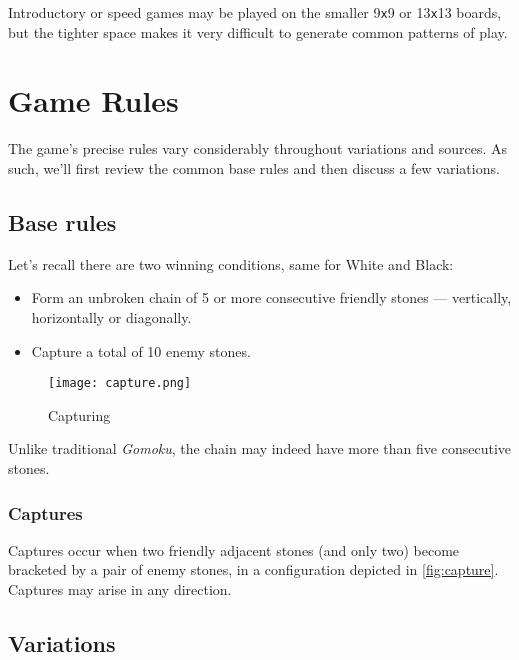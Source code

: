 \documentclass[12pt,a4paper,notitlepage]{article}
\newcommand*{\boardsize}[1]{#1\texttt{x}#1}
\begin{document}
Introductory or speed games may be played on the smaller \boardsize{9} or \boardsize{13} boards, but the tighter space makes it very difficult to generate common patterns of play.

\section{Game Rules}
\label{sec:rules}

The game's precise rules vary considerably throughout variations and sources. As such, we'll first review the common base rules and then discuss a few variations.

\subsection{Base rules}
\label{subsec:baserules}

Let's recall there are two winning conditions, same for White and Black:

\begin{itemize}
	\large
	\item Form an unbroken chain of 5 or more consecutive friendly stones --- vertically, horizontally or diagonally.
	\item Capture a total of 10 enemy stones.
\end{itemize}

\begin{wrapfigure}[8]{r}[2em]{0.3\textwidth}
	\vspace*{-3\baselineskip}
	\texttt{[image: capture.png]}
	\caption{Capturing\supercite{pente-net} \label{fig:capture}}
\end{wrapfigure}

Unlike traditional \textit{Gomoku}, the chain may indeed have more than five consecutive stones.

\subsubsection{Captures}
\label{subsubsec:captures}

Captures occur when two friendly adjacent stones (and only two) become bracketed by a pair of enemy stones, in a configuration depicted in \autoref{fig:capture}. Captures may arise in any direction.

\subsection{Variations}
\label{subsec:variations}
\end{document}
